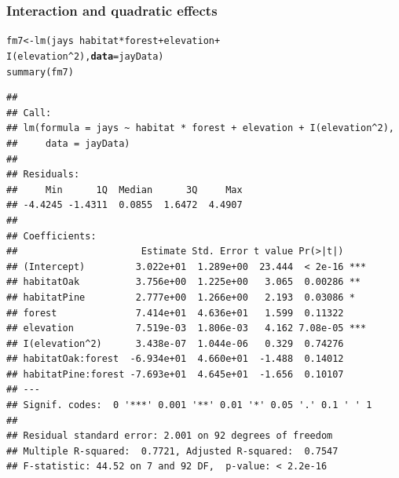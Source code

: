 \documentclass[color=usenames,dvipsnames]{beamer}\usepackage[]{graphicx}\usepackage[]{color}
\makeatletter
\newcommand{\hlnum}[1]{\textcolor[rgb]{0.69,0.494,0}{#1}}%
\newcommand{\hlopt}[1]{\textcolor[rgb]{0,0,0}{#1}}%
\newcommand{\hlstd}[1]{\textcolor[rgb]{0,0,0}{#1}}%
\newcommand{\hlkwb}[1]{\textcolor[rgb]{0,0.341,0.682}{#1}}%
\newcommand{\hlkwc}[1]{\textcolor[rgb]{0,0,0}{\textbf{#1}}}%
\newcommand{\hlkwd}[1]{\textcolor[rgb]{0.004,0.004,0.506}{#1}}%
\newenvironment{kframe}{%
 \def\at@end@of@kframe{}%
 \ifinner\ifhmode%
  \def\at@end@of@kframe{\end{minipage}}%
  \begin{minipage}{\columnwidth}%
 \fi\fi%
 \def\FrameCommand##1{\hskip\@totalleftmargin \hskip-\fboxsep
 \colorbox{shadecolor}{##1}\hskip-\fboxsep
     \hskip-\linewidth \hskip-\@totalleftmargin \hskip\columnwidth}%
 \MakeFramed {\advance\hsize-\width
   \@totalleftmargin\z@ \linewidth\hsize
   \@setminipage}}%
 {\par\unskip\endMakeFramed%
 \at@end@of@kframe}
\newenvironment{knitrout}{}{} %
\makeatother
\begin{document}
\begin{frame}[fragile]
  \frametitle{Interaction and quadratic effects}
  \vspace{-2mm}
\begin{knitrout}\tiny
{}\color{fgcolor}\begin{kframe}
\begin{alltt}
\hlstd{fm7} \hlkwb{<-} \hlkwd{lm}\hlstd{(jays} \hlopt{~} \hlstd{habitat} \hlopt{*} \hlstd{forest} \hlopt{+} \hlstd{elevation} \hlopt{+}
          \hlkwd{I}\hlstd{(elevation}\hlopt{^}\hlnum{2}\hlstd{),} \hlkwc{data}\hlstd{=jayData)}
\hlkwd{summary}\hlstd{(fm7)}
\end{alltt}
\begin{verbatim}
## 
## Call:
## lm(formula = jays ~ habitat * forest + elevation + I(elevation^2), 
##     data = jayData)
## 
## Residuals:
##     Min      1Q  Median      3Q     Max 
## -4.4245 -1.4311  0.0855  1.6472  4.4907 
## 
## Coefficients:
##                      Estimate Std. Error t value Pr(>|t|)    
## (Intercept)         3.022e+01  1.289e+00  23.444  < 2e-16 ***
## habitatOak          3.756e+00  1.225e+00   3.065  0.00286 ** 
## habitatPine         2.777e+00  1.266e+00   2.193  0.03086 *  
## forest              7.414e+01  4.636e+01   1.599  0.11322    
## elevation           7.519e-03  1.806e-03   4.162 7.08e-05 ***
## I(elevation^2)      3.438e-07  1.044e-06   0.329  0.74276    
## habitatOak:forest  -6.934e+01  4.660e+01  -1.488  0.14012    
## habitatPine:forest -7.693e+01  4.645e+01  -1.656  0.10107    
## ---
## Signif. codes:  0 '***' 0.001 '**' 0.01 '*' 0.05 '.' 0.1 ' ' 1
## 
## Residual standard error: 2.001 on 92 degrees of freedom
## Multiple R-squared:  0.7721,	Adjusted R-squared:  0.7547 
## F-statistic: 44.52 on 7 and 92 DF,  p-value: < 2.2e-16
\end{verbatim}
\end{kframe}
\end{knitrout}
\end{frame}
\end{document}
